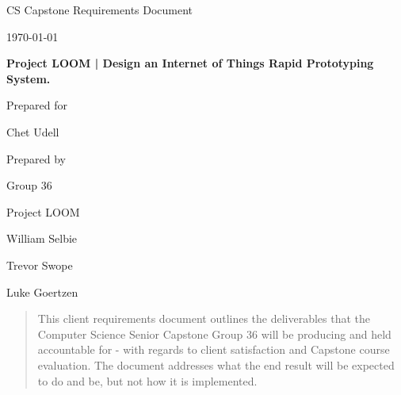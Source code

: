 \documentclass[onecolumn, draftclsnofoot,10pt, compsoc]{IEEEtran}
\def \CapstoneTeamName{		Project LOOM}
\def \CapstoneTeamNumber{		36}
\def \GroupMemberOne{			William Selbie}
\def \GroupMemberTwo{			Trevor Swope}
\def \GroupMemberThree{			Luke Goertzen}
\def \CapstoneProjectName{		Project LOOM | Design an Internet of Things Rapid Prototyping System.}
\def \CapstoneSponsorCompany{	}
\def \CapstoneSponsorPerson{		Chet Udell}
\def \DocType{	%
				Requirements Document
				}
\newcommand{\NameSigPair}[1]{\par
\makebox[2.75in][r]{#1} \hfil 	\makebox[3.25in]{\makebox[2.25in]{\hrulefill} \hfill		\makebox[.75in]{\hrulefill}}
\par\vspace{-12pt} \textit{\tiny\noindent
\makebox[2.75in]{} \hfil		\makebox[3.25in]{\makebox[2.25in][r]{Signature} \hfill	\makebox[.75in][r]{Date}}}}
\renewcommand{\NameSigPair}[1]{#1}
\begin{document}
\begin{titlepage}
    \begin{singlespace}
        \hfill 
        \par\vspace{.2in}
        \centering
        \scshape{
            \huge CS Capstone \DocType \par
            {\large\today}\par
            \vspace{.5in}
            \textbf{\Huge\CapstoneProjectName}\par
            \vfill
            {\large Prepared for}\par
            \Huge \CapstoneSponsorCompany\par
            \vspace{5pt}
            {\Large\NameSigPair{\CapstoneSponsorPerson}\par}
            {\large Prepared by }\par
            Group\CapstoneTeamNumber\par
            \CapstoneTeamName\par 
            \vspace{5pt}
            {\Large
                \NameSigPair{\GroupMemberOne}\par
                \NameSigPair{\GroupMemberTwo}\par
                \NameSigPair{\GroupMemberThree}\par
            }
            \vspace{20pt}
        }
        \begin{abstract}
			This client requirements document outlines the deliverables that the Computer Science Senior Capstone Group 36 will be producing and held accountable for - with regards to client satisfaction and Capstone course evaluation.
			The document addresses what the end result will be expected to do and be, but not how it is implemented. 
		\end{abstract}     
    \end{singlespace}
\end{titlepage}
\newpage
{}
\tableofcontents
\clearpage
\end{document}
